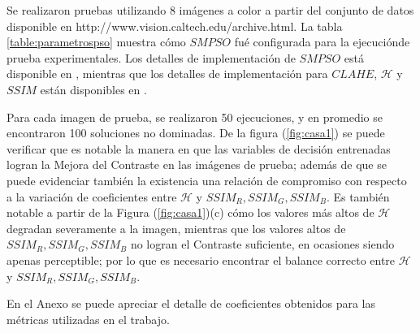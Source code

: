 Se realizaron pruebas utilizando 8 imágenes a color a partir del conjunto de datos disponible en http://www.vision.caltech.edu/archive.html. La tabla \ref{table:parametrospso} muestra cómo $SMPSO$ fué configurada para la ejecuciónde prueba experimentales. Los detalles de implementación de $SMPSO$ está disponible en \cite{durillo2010jmetal}, mientras que los detalles de implementación para $CLAHE$, $\mathscr{H}$ y $SSIM$ están disponibles en \cite{bradski2000opencv}. 

Para cada imagen de prueba, se realizaron 50 ejecuciones, y en promedio se encontraron 100 soluciones no dominadas. De la figura (\ref{fig:casa1}) se puede verificar que es notable la manera en que las variables de decisión entrenadas logran la Mejora del Contraste en las imágenes de prueba; además de que se puede evidenciar también la existencia una relación de compromiso con respecto a la variación de coeficientes entre $\mathscr{H}$ y $SSIM_R,SSIM_G,SSIM_B$. Es también notable a partir de la Figura (\ref{fig:casa1})(c) cómo los valores más altos de $\mathscr{H}$ degradan severamente a la imagen, mientras que los valores altos de $SSIM_R,SSIM_G,SSIM_B$ no logran el Contraste suficiente, en ocasiones siendo apenas perceptible; por lo que es necesario encontrar el balance correcto entre $\mathscr{H}$ y $SSIM_R,SSIM_G,SSIM_B$.

En el Anexo se puede apreciar el detalle de coeficientes obtenidos para las métricas utilizadas en el trabajo.


